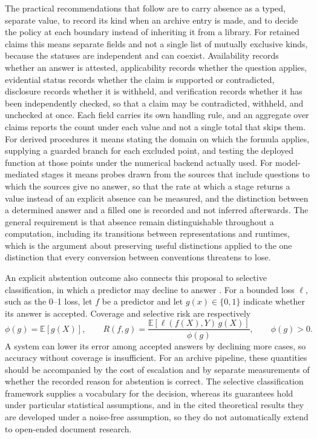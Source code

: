 \documentclass[11pt]{article}
\theoremstyle{remark}
\begin{document}
The practical recommendations that follow are to carry absence as a typed, separate value, to record its kind when an archive entry is made, and to decide the policy at each boundary instead of inheriting it from a library. For retained claims this means separate fields and not a single list of mutually exclusive kinds, because the statuses are independent and can coexist. Availability records whether an answer is attested, applicability records whether the question applies, evidential status records whether the claim is supported or contradicted, disclosure records whether it is withheld, and verification records whether it has been independently checked, so that a claim may be contradicted, withheld, and unchecked at once. Each field carries its own handling rule, and an aggregate over claims reports the count under each value and not a single total that skips them. For derived procedures it means stating the domain on which the formula applies, supplying a guarded branch for each excluded point, and testing the deployed function at those points under the numerical backend actually used. For model-mediated stages it means probes drawn from the sources that include questions to which the sources give no answer, so that the rate at which a stage returns a value instead of an explicit absence can be measured, and the distinction between a determined answer and a filled one is recorded and not inferred afterwards. The general requirement is that absence remain distinguishable throughout a computation, including its transitions between representations and runtimes, which is the argument about preserving useful distinctions applied to the one distinction that every conversion between conventions threatens to lose.

An explicit abstention outcome also connects this proposal to selective classification, in which a predictor may decline to answer \cite{elyaniv2010}. For a bounded loss $\ell$, such as the 0--1 loss, let $f$ be a predictor and let $g(x) \in \{0,1\}$ indicate whether its answer is accepted. Coverage and selective risk are respectively
\begin{equation}
\phi(g) = \mathbb{E}[g(X)], \qquad R(f,g) = \frac{\mathbb{E}\!\left[\ell(f(X),Y)\,g(X)\right]}{\phi(g)}, \qquad \phi(g) > 0.
\end{equation}
A system can lower its error among accepted answers by declining more cases, so accuracy without coverage is insufficient. For an archive pipeline, these quantities should be accompanied by the cost of escalation and by separate measurements of whether the recorded reason for abstention is correct. The selective classification framework supplies a vocabulary for the decision, whereas its guarantees hold under particular statistical assumptions, and in the cited theoretical results they are developed under a noise-free assumption, so they do not automatically extend to open-ended document research.
\end{document}
